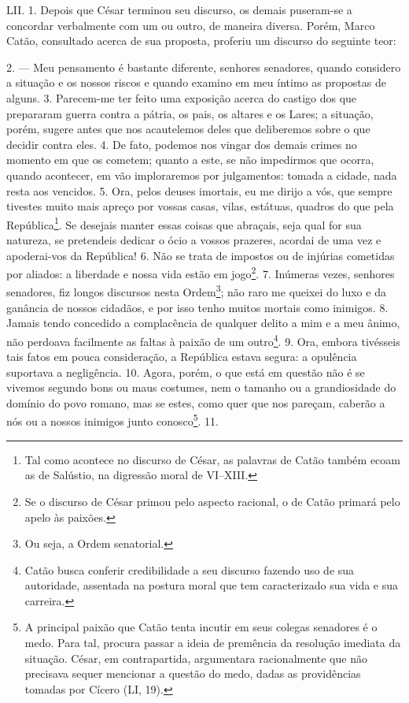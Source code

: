 LII. 1. Depois que César terminou seu discurso, os demais puseram-se a concordar 
verbalmente com um ou outro, de maneira diversa. Porém, Marco Catão, consultado
acerca de sua proposta, proferiu um discurso do seguinte teor: 

2. --- Meu pensamento é bastante diferente, senhores senadores, quando considero a
situação e os nossos riscos e quando examino em meu íntimo as propostas de
alguns. 3. Parecem-me ter feito uma exposição acerca do castigo dos que
prepararam guerra contra a pátria, os pais, os altares e os Lares; a situação,
porém, sugere antes que nos acautelemos deles que deliberemos sobre o que
decidir contra eles. 4. De fato, podemos nos vingar dos demais crimes no
momento em que os cometem; quanto a este, se não impedirmos que ocorra, quando
acontecer, em vão imploraremos por julgamentos: tomada a cidade, nada resta aos
vencidos. 5. Ora, pelos deuses imortais, eu me dirijo a vós, que sempre
tivestes muito mais apreço por vossas casas, vilas, estátuas, quadros do que
pela República\footnote{Tal como acontece no discurso de César, as palavras de
Catão também ecoam as de Salústio, na digressão moral de VI--XIII.}. Se
desejais manter essas coisas que abraçais, seja qual for sua natureza, se
pretendeis dedicar o ócio a vossos prazeres, acordai de uma vez e apoderai-vos
da República! 6. Não se trata de impostos ou de injúrias cometidas por aliados:
a liberdade e nossa vida estão em jogo\footnote{Se o discurso de César primou
pelo aspecto racional, o de Catão primará pelo apelo às paixões.}. 7. Inúmeras
vezes, senhores senadores, fiz longos discursos nesta Ordem\footnote{Ou seja, a Ordem senatorial.}; não raro me
queixei do luxo e da ganância de nossos cidadãos, e por isso tenho muitos
mortais como inimigos. 8. Jamais tendo concedido a complacência de qualquer
delito a mim e a meu ânimo, não perdoava facilmente as faltas à paixão de um
outro\footnote{Catão busca conferir credibilidade a seu discurso fazendo uso de
sua autoridade, assentada na postura moral que tem caracterizado sua vida e sua
carreira.}. 9. Ora, embora tivésseis tais fatos em pouca consideração, a
República estava segura: a opulência suportava a negligência. 10. Agora, porém,
o que está em questão não é se vivemos segundo bons ou maus costumes, nem o tamanho
ou a grandiosidade do domínio do povo romano, mas se estes, como quer que nos
pareçam, caberão a nós ou a nossos inimigos junto conosco\footnote{A principal
paixão que Catão tenta incutir em seus colegas senadores é o medo. Para tal,
procura passar a ideia de premência da resolução imediata da situação. César,
em contrapartida, argumentara racionalmente que não precisava sequer mencionar
a questão do medo, dadas as providências tomadas por Cícero (LI, 19).}. 11.

